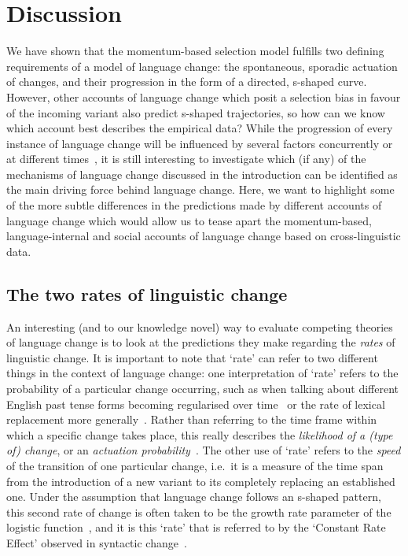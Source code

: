 \section{Discussion}

We have shown that the momentum-based selection model fulfills two defining requirements of a model of language change: the spontaneous, sporadic actuation of changes, and their progression in the form of a directed, s-shaped curve. However, other accounts of language change which posit a selection bias in favour of the incoming variant also predict s-shaped trajectories, so how can we know which account best describes the empirical data? While the progression of every instance of language change will be influenced by several factors concurrently or at different times~\citep[see e.g.][]{Ghanbarnejad2014,Stanford2014handbook}, it is still interesting to investigate which (if any) of the mechanisms of language change discussed in the introduction can be identified as the main driving force behind language change. Here, we want to highlight some of the more subtle differences in the predictions made by different accounts of language change which would allow us to tease apart the momentum-based, language-internal and social accounts of language change based on cross-linguistic data.

\subsection{The two rates of linguistic change}
\label{sec:tworates}
An interesting (and to our knowledge novel) way to evaluate competing theories of language change is to look at the predictions they make regarding the \emph{rates} of linguistic change. It is important to note that `rate' can refer to two different things in the context of language change: one interpretation of `rate' refers to the probability of a particular change occurring, such as when talking about different English past tense forms becoming regularised over time~\citep{Lieberman2007} or the rate of lexical replacement more generally~\citep{Sankoff1970,Wichmann2009,Greenhill2010,Monaghan2014}. Rather than referring to the time frame within which a specific change takes place, this really describes the \emph{likelihood of a (type of) change}, or an \emph{actuation probability}~\citep{Cowgill1963}. The other use of `rate' refers to the \emph{speed} of the transition of one particular change, i.e.~it is a measure of the time span from the introduction of a new variant to its completely replacing an established one. Under the assumption that language change follows an s-shaped pattern, this second rate of change is often taken to be the growth rate parameter of the logistic function~\citep{Pintzuk2003}, and it is this `rate' that is referred to by the `Constant Rate Effect' observed in syntactic change~\citep{Kroch1989cr}.

